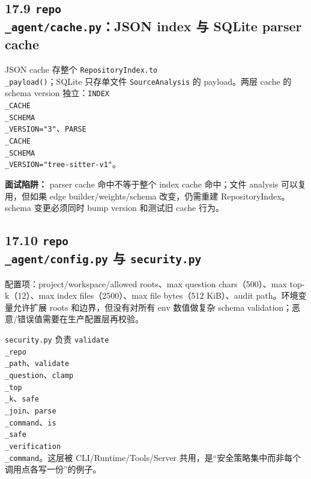 \documentclass[UTF8,12pt,openany]{ctexbook}
\begin{document}
\subsection{17.9 \texttt{repo\\_agent/cache.py}：JSON index 与 SQLite parser cache}

JSON cache 存整个 \texttt{RepositoryIndex.to\\_payload()}；SQLite 只存单文件 \texttt{SourceAnalysis} 的 payload。两层 cache 的 schema version 独立：\texttt{INDEX\\_CACHE\\_SCHEMA\\_VERSION="3"}、\texttt{PARSE\\_CACHE\\_SCHEMA\\_VERSION="tree-sitter-v1"}。\par

\textbf{面试陷阱：} parser cache 命中不等于整个 index cache 命中；文件 analysis 可以复用，但如果 edge builder/weights/schema 改变，仍需重建 RepositoryIndex。schema 变更必须同时 bump version 和测试旧 cache 行为。\par

\subsection{17.10 \texttt{repo\\_agent/config.py} 与 \texttt{security.py}}

配置项：project/workspace/allowed roots、max question chars（500）、max top-k（12）、max index files（2500）、max file bytes（512 KiB）、audit path。环境变量允许扩展 roots 和边界，但没有对所有 env 数值做复杂 schema validation；恶意/错误值需要在生产配置层再校验。\par

\texttt{security.py} 负责 \texttt{validate\\_repo\\_path}、\texttt{validate\\_question}、\texttt{clamp\\_top\\_k}、\texttt{safe\\_join}、\texttt{parse\\_command}、\texttt{is\\_safe\\_verification\\_command}。这层被 CLI/Runtime/Tools/Server 共用，是“安全策略集中而非每个调用点各写一份”的例子。\par
\end{document}
